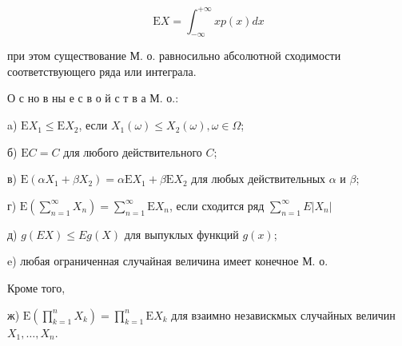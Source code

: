 \documentclass[10pt]{article}
\begin{document}
\[

\mathrm{E} X=\int_{-\infty}^{+\infty} x p(x) d x

\]



при этом существование М. о. равносильно абсолютной сходимости соответствующего ряда или интеграла.



О с но в ны е с в о й с т в а М. о.:



a) $\mathrm{E} X_{1} \leqslant \mathrm{E} X_{2}$, если $X_{1}(\omega) \leqslant X_{2}(\omega), \omega \in \Omega$;



б) $\mathrm{E} C=C$ для любого действительного $C$;



в) $\mathrm{E}\left(\alpha X_{1}+\beta X_{2}\right)=\alpha \mathrm{E} X_{1}+\beta \mathrm{E} X_{2}$ для любых действительных $\alpha$ и $\beta$;



г) $\mathrm{E}\left(\sum_{n=1}^{\infty} X_{n}\right)=\sum_{n=1}^{\infty} \mathrm{E} X_{n}$, если сходится ряд $\sum_{n=1}^{\infty} E\left|X_{n}\right|$



д) $g(E X) \leqslant E g(X)$ для выпуклых функций $g(x)$;



e) любая ограниченная случайная величина имеет конечное М. о.



Кроме того,



ж) $\mathrm{E}\left(\prod_{k=1}^{n} X_{k}\right)=\prod_{k=1}^{n} \mathrm{E} X_{k}$ для взаимно независкмых случайных величин $X_{1}, \ldots, X_{n}$.
\end{document}
